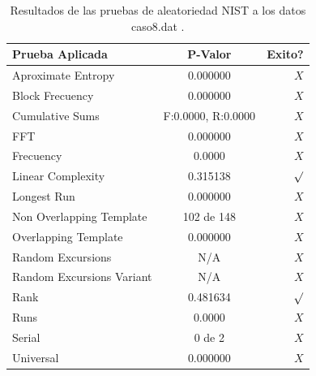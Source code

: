 \documentclass[10pt]{IEEEtran}
\begin{document}
\begin{table}[H]
\caption{Resultados de las pruebas de aleatoriedad NIST a los datos caso8.dat .}
\label{caso8}
\begin{center}
\begin{small}
\begin{tabular}{|l|c|r|}
\hline

Prueba Aplicada &  P-Valor & Exito? \\
\hline

Aproximate Entropy    &     0.000000 & $X$ \\

Block Frecuency  & 0.000000  &  $X$  \\

Cumulative Sums    &   F:0.0000, R:0.0000   & $X$ \\

FFT    &   0.000000 &   $X$      \\

Frecuency     & 0.0000 &  $X$   \\

Linear Complexity      &  0.315138  & $\surd$ \\

Longest Run      &   0.000000 &   $X$     \\

Non Overlapping Template      & 102 de 148    &    $X$          \\

Overlapping Template      &    0.000000   &       $X$        \\

Random Excursions      & N/A  &    $X$      \\

Random Excursions Variant & N/A &     $X$    \\

Rank &  0.481634  &      $\surd$      \\

Runs &     0.0000  &       $X$      \\

Serial &     0 de 2    &     $X$        \\

Universal &        0.000000  &      $X$             \\

\hline

\end{tabular}
\end{small}
\end{center}
\end{table}
\end{document}
